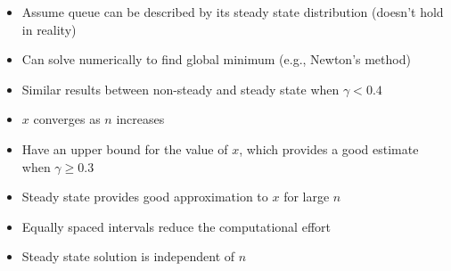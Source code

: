 \documentclass{article}
\begin{document}
\begin{itemize}
    \item Assume queue can be described by its steady state distribution (doesn't hold in reality)
    \item Can solve numerically to find global minimum (e.g., Newton's method)
    \item Similar results between non-steady and steady state when $\gamma < 0.4$
    \item $x$ converges as $n$ increases
    \item Have an upper bound for the value of $x$, which provides a good estimate when $\gamma \geq 0.3$
    \item Steady state provides good approximation to $x$ for large $n$
    \item Equally spaced intervals reduce the computational effort
    \item Steady state solution is independent of $n$
\end{itemize}
\end{document}
